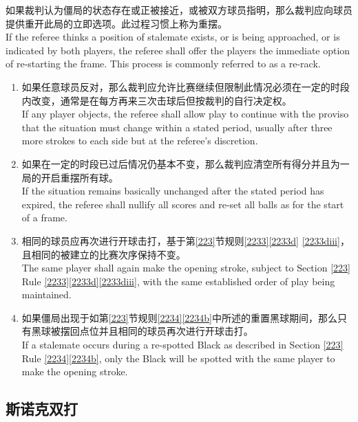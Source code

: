 \noindent 如果裁判认为僵局的状态存在或正被接近，或被双方球员指明，那么裁判应向球员提供重开此局的立即选项。此过程习惯上称为重摆。\\
If the referee thinks a position of stalemate exists, or is being approached, or is indicated by both players, the referee shall offer the players the immediate option of re-starting the frame. This process is commonly referred to as a re-rack.
\begin{enumerate}[label=(\alph*)]
    \item 如果任意球员反对，那么裁判应允许比赛继续但限制此情况必须在一定的时段内改变，通常是在每方再来三次击球后但按裁判的自行决定权。\\
    If any player objects, the referee shall allow play to continue with the proviso that the situation must change within a stated period, usually after three more strokes to each side but at the referee's discretion.
    \item 如果在一定的时段已过后情况仍基本不变，那么裁判应清空所有得分并且为一局的开启重摆所有球。\\
    If the situation remains basically unchanged after the stated period has expired, the referee shall nullify all scores and re-set all balls as for the start of a frame.
    \item 相同的球员应再次进行开球击打，基于第\ref{223}节规则\ref{2233}\ref{2233d} \ref{2233diii}，且相同的被建立的比赛次序保持不变。\\
    The same player shall again make the opening stroke, subject to Section \ref{223} Rule \ref{2233}\ref{2233d}\ref{2233diii}, with the same established order of play being maintained.
    \item 如果僵局出现于如第\ref{223}节规则\ref{2234}\ref{2234b}中所述的重置黑球期间，那么只有黑球被摆回点位并且相同的球员再次进行开球击打。\\
    If a stalemate occurs during a re-spotted Black as described in Section \ref{223} Rule \ref{2234}\ref{2234b}, only the Black will be spotted with the same player to make the opening stroke.
\end{enumerate}

\subsection{斯诺克双打}\label{22318}

